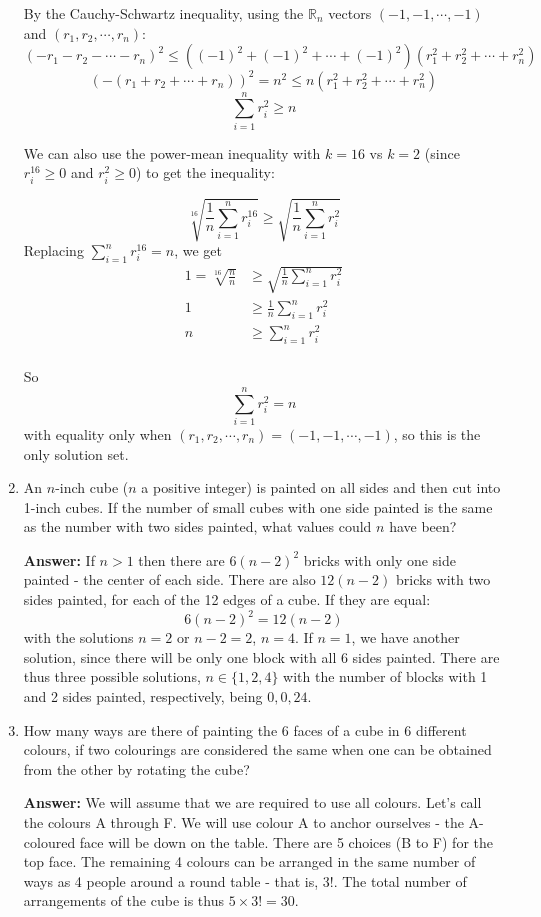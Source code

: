 \documentclass{article}
\begin{document}
\begin{enumerate}
    By the Cauchy-Schwartz inequality, using the $\mathbb{R}_n$ vectors $(-1, -1, \cdots, -1)$ and $(r_1, r_2, \cdots, r_n)$:
    \[ (-r_1 -r_2 -\cdots -r_n)^2 \leq ((-1)^2 + (-1)^2 + \cdots + (-1)^2)(r_1^2 + r_2^2 + \cdots + r_n^2)\]
    \[ (-(r_1 +r_2 +\cdots +r_n))^2 = n^2 \leq n(r_1^2 + r_2^2 + \cdots + r_n^2)\]
    \[ \sum_{i=1}^n r_i^{2} \geq n \]

    We can also use the power-mean inequality with $k=16$ vs $k=2$ (since $r_i^{16} \geq 0$ and $r_i^{2} \geq 0$) to get the inequality:
    
    \[\sqrt[16]{\frac{1}{n}\sum_{i=1}^n r_i^{16}} \geq \sqrt{\frac{1}{n}\sum_{i=1}^n r_i^{2}} \]
    Replacing $\sum_{i=1}^n r_i^{16} = n$, we get 
    \begin{align*}
    1 = \sqrt[16]{\frac{n}{n}} &\geq \sqrt{\frac{1}{n}\sum_{i=1}^n r_i^2} \\
    1 &\geq \frac{1}{n}\sum_{i=1}^n r_i^2 \\
    n &\geq \sum_{i=1}^n r_i^{2} \\ \end{align*}
    
    So
    \[ \sum_{i=1}^n r_i^2 = n \]
    with equality only when $(r_1, r_2, \cdots, r_n) = (-1, -1, \cdots, -1)$, so this is the only solution set.
    
    \item An $n$-inch cube ($n$ a positive integer) is painted on all sides and then cut into 1-inch cubes. If the number of small cubes with one side painted is the same as the number with two sides painted, what values could $n$ have been?
    
    \textbf{Answer:} If $n>1$ then there are $6(n-2)^2$ bricks with only one side painted - the center of each side. There are also $12(n-2)$ bricks with two sides painted, for each of the 12 edges of a cube. If they are equal:
    \[6(n-2)^2 = 12(n-2) \]
    with the solutions $n=2$ or $n-2 = 2$, $n=4$. If $n=1$, we have another solution, since there will be only one block with all 6 sides painted. There are thus three possible solutions, $n\in\{1, 2, 4\}$ with the number of blocks with 1 and 2 sides painted, respectively, being $0, 0, 24$.
    
    \item How many ways are there of painting the 6 faces of a cube in 6 different colours, if two colourings are considered the same when one can be obtained from the other by rotating the cube?
    
    \textbf{Answer:} We will assume that we are required to use all colours. Let's call the colours A through F. We will use colour A to anchor ourselves - the A-coloured face will be down on the table. There are 5 choices (B to F) for the top face. The remaining 4 colours can be arranged in the same number of ways as 4 people around a round table - that is, 3!. The total number of arrangements of the cube is thus $5\times 3! = 30$.
    

\end{enumerate}
\end{document}
